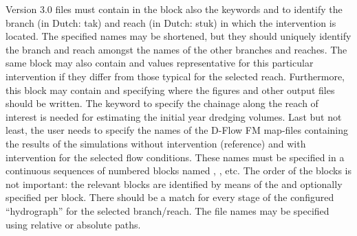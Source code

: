 Version 3.0 files must contain in the \keyw{[General]} block also the keywords  and  to identify the branch (in Dutch: tak) and reach (in Dutch: stuk) in which the intervention is located.
The specified names may be shortened, but they should uniquely identify the branch and reach amongst the names of the other branches and reaches.
The same block may also contain  and  values representative for this particular intervention if they differ from those typical for the selected reach.
Furthermore, this block may contain  and  specifying where the figures and other output files should be written.
The  keyword to specify the chainage along the reach of interest is needed for estimating the initial year dredging volumes.
Last but not least, the user needs to specify the names of the D-Flow FM map-files containing the results of the simulations without intervention (reference) and with intervention for the selected flow conditions.
These names must be specified in a continuous sequences of numbered blocks named , , etc.
The order of the blocks is not important: the relevant blocks are identified by means of the  and optionally  specified per block.
There should be a match for every stage of the configured ``hydrograph'' for the selected branch/reach.
The file names may be specified using relative or absolute paths.

